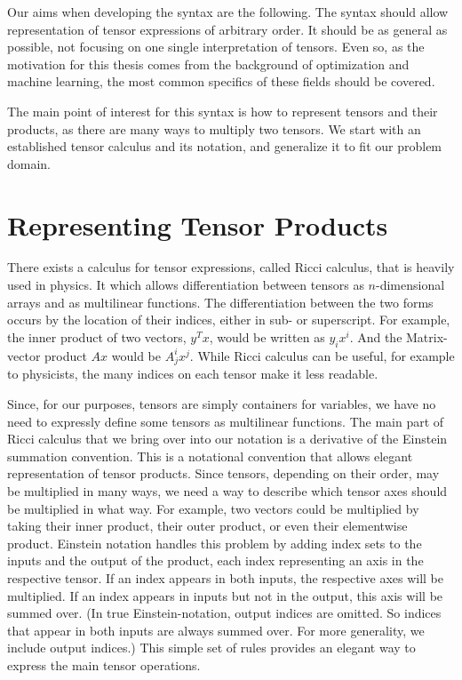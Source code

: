 \documentclass[12pt, a4paper]{report}
\begin{document}
Our aims when developing the syntax are the following.
The syntax should allow representation of tensor expressions of arbitrary order.
It should be as general as possible, not focusing on one single interpretation of tensors.
Even so, as the motivation for this thesis comes from the background of optimization and machine learning, the most common specifics of these fields should be covered.

The main point of interest for this syntax is how to represent tensors and their products, as there are many ways to multiply two tensors.
We start with an established tensor calculus and its notation, and generalize it to fit our problem domain.

\section{Representing Tensor Products}
There exists a calculus for tensor expressions, called Ricci calculus, that is heavily used in physics.
It which allows differentiation between tensors as $n$-dimensional arrays and as multilinear functions.
The differentiation between the two forms occurs by the location of their indices, either in sub- or superscript.
For example, the inner product of two vectors, $y^Tx$, would be written as $y_ix^i$. And the Matrix-vector product $Ax$ would be $A^i_jx^j$.
While Ricci calculus can be useful, for example to physicists, the many indices on each tensor make it less readable.

Since, for our purposes, tensors are simply containers for variables, we have no need to expressly define some tensors as multilinear functions.
The main part of Ricci calculus that we bring over into our notation is a derivative of the Einstein summation convention.
This is a notational convention that allows elegant representation of tensor products.
Since tensors, depending on their order, may be multiplied in many ways, we need a way to describe which tensor axes should be multiplied in what way.
For example, two vectors could be multiplied by taking their inner product, their outer product, or even their elementwise product.
Einstein notation handles this problem by adding index sets to the inputs and the output of the product, each index representing an axis in the respective tensor.
If an index appears in both inputs, the respective axes will be multiplied.
If an index appears in inputs but not in the output, this axis will be summed over. (In true Einstein-notation, output indices are omitted. So indices that appear in both inputs are always summed over. For more generality, we include output indices.)
This simple set of rules provides an elegant way to express the main tensor operations.
\end{document}
